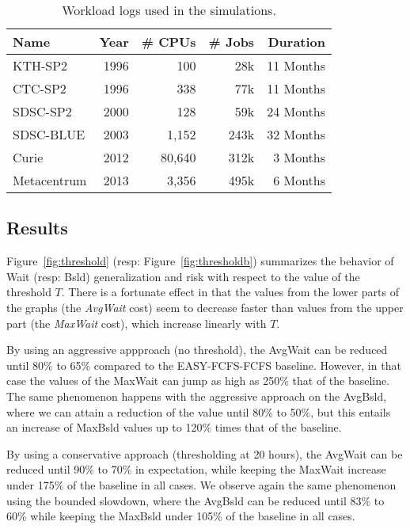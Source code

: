 \begin{table}[h]
  \vspace{-0.5cm}
  \centering
  \caption{Workload logs used in the simulations.}
  \label{tab:logs}
  \begin{tabular}{@{}lrrrr@{}}
    \hline
    Name      & Year & \# CPUs      & \# Jobs       & Duration\\
    \hline
    KTH-SP2     & 1996 & 100       & 28k        & 11 Months\\
    CTC-SP2     & 1996 & 338       & 77k        & 11 Months\\
    SDSC-SP2    & 2000 & 128       & 59k        & 24 Months\\
    SDSC-BLUE   & 2003 & 1,152     & 243k       & 32 Months\\
    Curie       & 2012 & 80,640    & 312k       & 3  Months\\
    Metacentrum & 2013 & 3,356     & 495k       & 6  Months\\
    \hline
  \end{tabular}
  \vspace{-0.5cm}
\end{table}

\subsection{Results}

Figure~\ref{fig:threshold} (resp: Figure~\ref{fig:thresholdb}) summarizes the
behavior of Wait (resp: Bsld) generalization and risk with
respect to the value of the threshold $T$. There is a fortunate effect in that
the values from the lower parts of the graphs (the \textit{AvgWait} cost) seem
to decrease faster than values from the upper part (the \textit{MaxWait} cost),
which increase linearly with $T$.

By using an aggressive appproach (no threshold), the AvgWait can be reduced
until 80\% to 65\% compared to the EASY-FCFS-FCFS baseline. However, in that
case the values of the MaxWait can jump as high as 250\% that of the baseline.
The same phenomenon happens with the aggressive approach on the AvgBsld, where
we can attain a reduction of the value until 80\% to 50\%, but this entails an
increase of MaxBsld values up to 120\% times that of the baseline.

By using a conservative approach (thresholding at 20 hours), the AvgWait can be
reduced until 90\% to 70\% in expectation, while keeping the MaxWait increase
under 175\% of the baseline in all cases. We observe again the same phenomenon using the
bounded slowdown, where the AvgBsld can be reduced until 83\% to 60\% while
keeping the MaxBsld under 105\% of the baseline in all cases.

